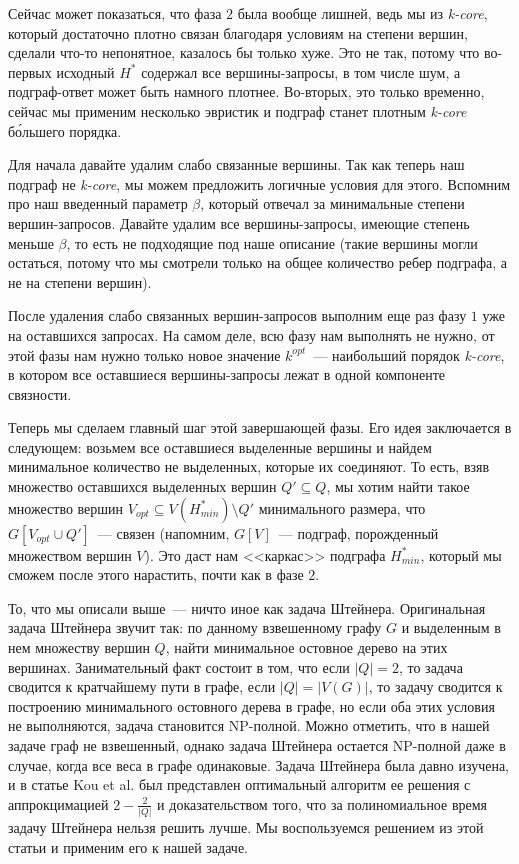 Сейчас может показаться, что фаза $2$ была вообще лишней, ведь мы из \textit{k-core}, который достаточно плотно связан благодаря условиям на степени вершин, сделали что-то непонятное, казалось бы только хуже. Это не так, потому что во-первых исходный $H^*$ содержал все вершины-запросы, в том числе шум, а подграф-ответ может быть намного плотнее. Во-вторых, это только временно, сейчас мы применим несколько эвристик и подграф станет плотным \textit{k-core} б\'{о}льшего порядка.

Для начала давайте удалим слабо связанные вершины. Так как теперь наш подграф не \textit{k-core}, мы можем предложить логичные условия для этого. Вспомним про наш введенный параметр $\beta$, который отвечал за минимальные степени вершин-запросов. Давайте удалим все вершины-запросы, имеющие степень меньше $\beta$, то есть не подходящие под наше описание (такие вершины могли остаться, потому что мы смотрели только на общее количество ребер подграфа, а не на степени вершин).

После удаления слабо связанных вершин-запросов выполним еще раз фазу $1$ уже на оставшихся запросах. На самом деле, всю фазу нам выполнять не нужно, от этой фазы нам нужно только новое значение $k^{opt}$~--- наибольший порядок \textit{k-core}, в котором все оставшиеся вершины-запросы лежат в одной компоненте связности.

Теперь мы сделаем главный шаг этой завершающей фазы. Его идея заключается в следующем: возьмем все оставшиеся выделенные вершины и найдем минимальное количество не выделенных, которые их соединяют. То есть, взяв множество оставшихся выделенных вершин $Q' \subseteq Q$, мы хотим найти такое множество вершин $V_{opt} \subseteq V(H_{min}^*) \setminus Q'$ минимального размера, что $G[V_{opt} \cup Q']$~--- связен (напомним, $G[V]$~--- подграф, порожденный множеством вершин $V$). Это даст нам <<каркас>> подграфа $H_{min}^*$, который мы сможем после этого нарастить, почти как в фазе $2$.

То, что мы описали выше~--- ничто иное как задача Штейнера. Оригинальная задача Штейнера звучит так: по данному взвешенному графу $G$ и выделенным в нем множеству вершин $Q$, найти минимальное остовное дерево на этих вершинах. Занимательный факт состоит в том, что если $|Q| = 2$, то задача сводится к кратчайшему пути в графе, если $|Q| = |V(G)|$, то задачу сводится к построению минимального остовного дерева в графе, но если оба этих условия не выполняются, задача становится NP-полной. Можно отметить, что в нашей задаче граф не взвешенный, однако задача Штейнера остается NP-полной даже в случае, когда все веса в графе одинаковые. Задача Штейнера была давно изучена, и в статье Kou et al. \cite{Kou81} был представлен оптимальный алгоритм ее решения с аппрокцимацией $2 - \frac{2}{|Q|}$ и доказательством того, что за полиномиальное время задачу Штейнера нельзя решить лучше. Мы воспользуемся решением из этой статьи и применим его к нашей задаче.

